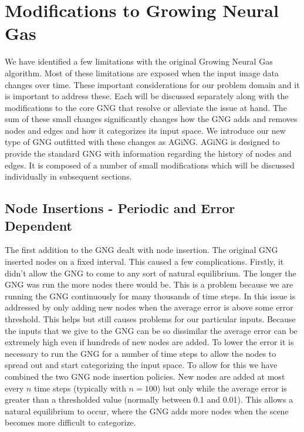 \documentclass{article}
\renewcommand{\|}{\origbar} %
\begin{document}
\section{Modifications to Growing Neural Gas}
\label{sec:modificationsGNG}


We have identified a few limitations with the original Growing Neural Gas algorithm. Most of these limitations are exposed when the input image data changes over time. These important considerations for our problem domain and it is important to address these. Each will be discussed separately along with the modifications to the core GNG that resolve or alleviate the issue at hand. The sum of these small changes significantly changes how the GNG adds and removes nodes and edges and how it categorizes its input space. We introduce our new type of GNG outfitted with these changes as AGiNG. AGiNG is designed to provide the standard GNG with information regarding the history of nodes and edges. It is composed of a number of small modifications which will be discussed individually in subsequent sections.

\subsection{Node Insertions - Periodic and Error Dependent}

The first addition to the GNG dealt with node insertion. The original GNG inserted nodes on a fixed interval. This caused a few complications. Firstly, it didn't allow the GNG to come to any sort of natural equilibrium. The longer the GNG was run the more nodes there would be. This is a problem because we are running the GNG continuously for many thousands of time steps. In  this issue is addressed by only adding new nodes when the average error is above some error threshold. This helps but still causes problems for our particular inputs. Because the inputs that we give to the GNG can be so dissimilar the average error can be extremely high even if hundreds of new nodes are added. To lower the error it is necessary to run the GNG for a number of time steps to allow the nodes to spread out and start categorizing the input space. To allow for this we have combined the two GNG node insertion policies. New nodes are added at most every $n$ time steps (typically with $n = 100$) but only while the average error is greater than a thresholded value (normally between 0.1 and 0.01). This allows a natural equilibrium to occur, where the GNG adds more nodes when the scene becomes more difficult to categorize.
\end{document}
